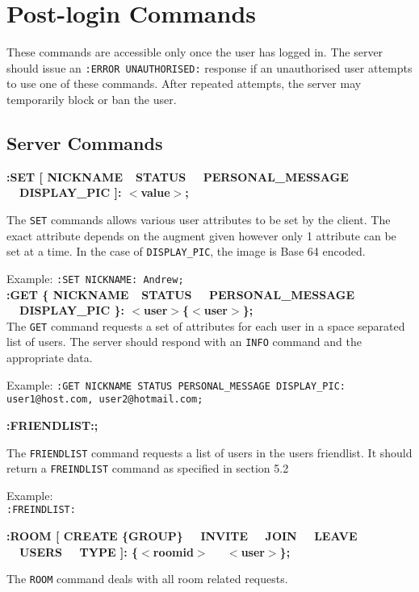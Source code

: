 \section{Post-login Commands}

These commands are accessible only once the user has logged in. The server should issue an \texttt{:ERROR UNAUTHORISED:} response if an unauthorised user attempts to use one of these commands. After repeated attempts, the server may temporarily block or ban the user.

\subsection*{Server Commands}

{\bf :SET [ NICKNAME\ \vline \ STATUS \ \vline \ PERSONAL\_MESSAGE \ \vline \ DISPLAY\_PIC ]: $<$value$>$;}

The \texttt{SET} commands allows various user attributes to be set by the client. The exact attribute depends on the augment given however only 1 attribute can be set at a time. In the case of \texttt{DISPLAY\_PIC}, the image is Base 64 encoded.

Example:
\texttt{:SET NICKNAME: Andrew;} \\

{\bf :GET \{ NICKNAME\ \vline \ STATUS \ \vline \ PERSONAL\_MESSAGE \ \vline \ DISPLAY\_PIC \}: $<$user$>$\{$<$user$>$\};} \\

The \texttt{GET} command requests a set of attributes for each user in a space separated list of users. The server should respond with an \texttt{INFO} command and the appropriate data.

Example:
\texttt{:GET NICKNAME STATUS PERSONAL\_MESSAGE DISPLAY\_PIC: user1@host.com, user2@hotmail.com;}

{\bf :FRIENDLIST:;}

The \texttt{FRIENDLIST} command requests a list of users in the users friendlist. It should return a \texttt{FREINDLIST} command as specified in section 5.2

Example: \\
\texttt{:FREINDLIST:} 
	
{\bf :ROOM [ CREATE \{GROUP\} \ \vline \ INVITE \ \vline \ JOIN \ \vline \ LEAVE \ \vline \ USERS \ \vline \ TYPE ]: \{$<$roomid$>$ \ \vline \ $<$user$>$\};}

The \texttt{ROOM} command deals with all room related requests.


